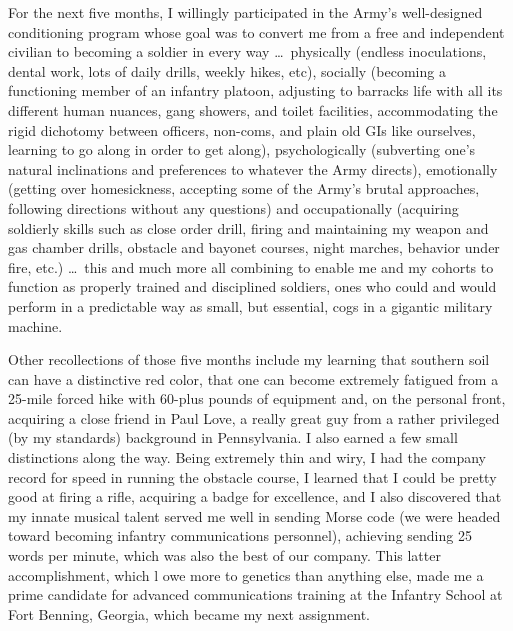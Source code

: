 \documentclass[../m3y]{subfiles}
\begin{document}
For the next five months, I willingly participated in the Army's well-designed conditioning program whose goal was to convert me from a free and independent civilian to becoming a soldier in every way \ldots\ physically (endless inoculations, dental work, lots of daily drills, weekly hikes, etc), socially (becoming a functioning member of an infantry platoon, adjusting to barracks life with all its different human nuances, gang showers, and toilet facilities, accommodating the rigid dichotomy between officers, non-coms, and plain old GIs like ourselves, learning to go along in order to get along), psychologically (subverting one's natural inclinations and preferences to whatever the Army directs), emotionally (getting over homesickness, accepting some of the Army's brutal approaches, following directions without any questions) and occupationally (acquiring soldierly skills such as close order drill, firing and maintaining my weapon and gas chamber drills, obstacle and bayonet courses, night marches, behavior under fire, etc.) \ldots\ this and much more all combining to enable me and my cohorts to function as properly trained and disciplined soldiers, ones who could and would perform in a predictable way as small, but essential, cogs in a gigantic military machine.

Other recollections of those five months include my learning that southern soil can have a distinctive red color, that one can become extremely fatigued from a 25-mile forced hike with 60-plus pounds of equipment and, on the personal front, acquiring a close friend in Paul Love, a really great guy from a rather privileged (by my standards) background in Pennsylvania. I also earned a few small distinctions along the way. Being extremely thin and wiry, I had the company record for speed in running the obstacle course, I learned that I could be pretty good at firing a rifle, acquiring a badge for excellence, and I also discovered that my innate musical talent served me well in sending Morse code (we were headed toward becoming infantry communications personnel), achieving sending 25 words per minute, which was also the best of our company. This latter accomplishment, which l owe more to genetics than anything else, made me a prime candidate for advanced communications training at the Infantry School at Fort Benning, Georgia, which became my next assignment.
\end{document}
